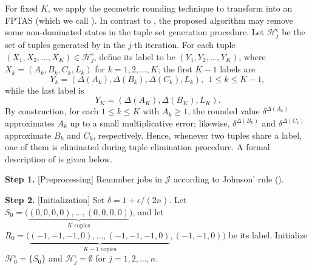 \documentclass[12pt]{article} \textheight=24.5cm \textwidth=16.5cm \parskip = 0.165cm
\begin{document}
\begin{sloppypar}
        For fixed $K$, we apply the geometric rounding technique to transform  into an FPTAS (which we call ).
        In contrast to , the proposed algorithm may remove some non-dominated states in the tuple set generation procedure.
        Let $\mathcal{H}_j^{\epsilon}$ be the set of tuples generated by  in the $j$-th iteration.
        For each tuple $(X_1, X_2, \ldots, X_K) \in \mathcal{H}_j^{\epsilon}$, define its label to be $(Y_1, Y_2, \ldots, Y_K)$, where $X_k=(A_k, B_k, C_k, L_k)$ for $k=1, 2, \ldots, K$; the first $K-1$ labels are
        \begin{equation*}
            Y_k=(\Delta(A_k), \Delta(B_k), \Delta(C_k), L_k), ~~ 1 \leq k \leq K-1,
        \end{equation*}
        while the last label is
        \begin{equation*}
            Y_K=(\Delta(A_K), \Delta(B_K), L_K).
        \end{equation*}
        By construction, for each $1 \leq k \leq K$ with $A_k \geq 1$, the rounded value $\delta^{\Delta(A_k)}$ approximates $A_k$ up to a small multiplicative error; likewise, $\delta^{\Delta(B_k)}$ and $\delta^{\Delta(C_k)}$ approximate $B_k$ and $C_k$, respectively.
        Hence, whenever two tuples share a label, one of them is eliminated during tuple elimination procedure.
        A formal description of  is given below.
        
        \begin{algorithm}[H]
            \small
            \linespread{1.2}\selectfont
            \SetAlgoLined
            \DontPrintSemicolon
            \caption{An FPTAS for $F2 \mid \mid C_{\max}^w$}  \label{alg-FPTAS}
            \BlankLine
            \textbf{Step 1.} [Preprocessing] Renumber jobs in $\mathcal{J}$ according to Johnson' rule (). \;
            
            \textbf{Step 2.} [Initialization] Set $\delta=1+\epsilon/(2n)$. Let  $S_0=\Big(\underbrace{(0,0,0,0),\ldots,(0,0,0,0)}_{K\text{ copies}}\Big)$, and let $R_0=\Big(\underbrace{(-1, -1, -1, 0),\ldots,(-1, -1, -1, 0)}_{K-1\text{ copies}}, (-1, -1, 0)\Big)$ be its label. Initialize $\mathcal{H}_0^{\epsilon}=\{S_0\}$ and $\mathcal{H}_j^{\epsilon}=\emptyset$ for $j=1, 2, \ldots, n$. \;
            

\end{algorithm}
\end{sloppypar}
\end{document}
